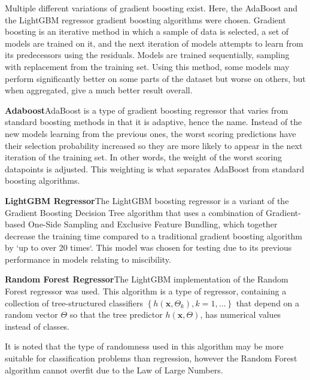 \documentclass[11pt, titlepage]{article}
\begin{document}
Multiple different variations of gradient boosting exist. Here, the AdaBoost and the LightGBM regressor gradient boosting algorithms were chosen. Gradient boosting is an iterative method in which a sample of data is selected, a set of models are trained on it, and the next iteration of models attempts to learn from its predecessors using the residuals. Models are trained sequentially, sampling with replacement from the training set\cite{Boosting_IBM}. Using this method, some models may perform significantly better on some parts of the dataset but worse on others, but when aggregated, give a much better result overall.

\begin{description}
	\item \textbf{Adaboost}\quad AdaBoost is a type of gradient boosting regressor that varies from standard boosting methods in that it is adaptive, hence the name. Instead of the new models learning from the previous ones, the worst scoring predictions have their selection probability increased so they are more likely to appear in the next iteration of the training set. In other words, the weight of the worst scoring datapoints is adjusted. This weighting is what separates AdaBoost from standard boosting algorithms\cite{AdaBoostDrucker}.
	\item \textbf{LightGBM Regressor}\quad The LightGBM boosting regressor is a variant of the Gradient Boosting Decision Tree algorithm that uses a combination of Gradient-based One-Side Sampling and Exclusive Feature Bundling, which together decrease the training time compared to a traditional gradient boosting algorithm by `up to over 20 times`\cite{LightGBMPaper}. This model was chosen for testing due to its previous performance in models relating to miscibility. 
	\item \textbf{Random Forest Regressor}\quad The LightGBM implementation of the Random Forest regressor was used\cite{LGBMRegressor}. This algorithm is a type of regressor, containing a collection of tree-structured classifiers $\left\{h(\mathbf{x}, \Theta_k), k=1,\dots\right\}$ that depend on a random vector $\Theta$ so that the tree predictor $h(\mathbf{x}, \Theta)$, has numerical values instead of classes. 
	
	It is noted that the type of randomness used in this algorithm may be more suitable for classification problems than regression, however the Random Forest algorithm cannot overfit due to the Law of Large Numbers\cite{Breiman2001}.
\end{description}
\end{document}
